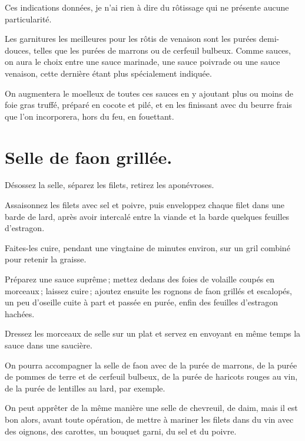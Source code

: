 Ces indications données, je n'ai rien à dire du rôtissage qui ne présente
aucune particularité.

Les garnitures les meilleures pour les rôtis de venaison sont les purées
demi-douces, telles que les purées de marrons ou de cerfeuil bulbeux. Comme
sauces, on aura le choix entre une sauce marinade, une sauce poivrade ou une
sauce venaison, cette dernière étant plus spécialement indiquée.

On augmentera le moelleux de toutes ces sauces en y ajoutant plus ou moins de
foie gras truffé, préparé en cocote et pilé, et en les finissant avec du beurre
frais que l’on incorporera, hors du feu, en fouettant.

\section*{\centering Selle de faon grillée.}
{}

Désossez la selle, séparez les filets, retirez les aponévroses.

Assaisonnez les filets avec sel et poivre, puis enveloppez chaque filet dans
une barde de lard, après avoir intercalé entre la viande et la barde quelques
feuilles d'estragon.

Faites-les cuire, pendant une vingtaine de minutes environ, sur un gril combiné
pour retenir la graisse.

Préparez une sauce suprême ; mettez dedans des foies de volaille coupés en
morceaux ; laissez cuire ; ajoutez ensuite les rognons de faon grillés et
escalopés, un peu d'oseille cuite à part et passée en purée, enfin des feuilles
d’estragon hachées.

Dressez les morceaux de selle sur un plat et servez en envoyant en même temps
la sauce dans une saucière.

\sk

On pourra accompagner la selle de faon avec de la purée de marrons, de la
purée de pommes de terre et de cerfeuil bulbeux, de la purée de haricots rouges
au vin, de la purée de lentilles au lard, par exemple.

\sk

On peut apprêter de la même manière une selle de chevreuil, de daim, mais il
est bon alors, avant toute opération, de mettre à mariner les filets dans du
vin avec des oignons, des carottes, un bouquet garni, du sel et du poivre.

